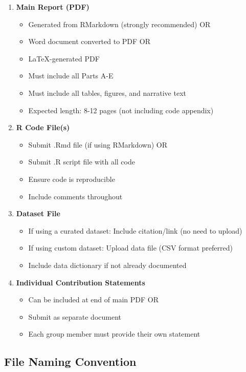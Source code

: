 \documentclass[11pt]{article}
\begin{document}
\begin{enumerate}
\item \textbf{Main Report (PDF)}
  \begin{itemize}
  \item Generated from RMarkdown (strongly recommended) OR
  \item Word document converted to PDF OR
  \item LaTeX-generated PDF
  \item Must include all Parts A-E
  \item Must include all tables, figures, and narrative text
  \item Expected length: 8-12 pages (not including code appendix)
  \end{itemize}

\item \textbf{R Code File(s)}
  \begin{itemize}
  \item Submit .Rmd file (if using RMarkdown) OR
  \item Submit .R script file with all code
  \item Ensure code is reproducible
  \item Include comments throughout
  \end{itemize}

\item \textbf{Dataset File}
  \begin{itemize}
  \item If using a curated dataset: Include citation/link (no need to upload)
  \item If using custom dataset: Upload data file (CSV format preferred)
  \item Include data dictionary if not already documented
  \end{itemize}

\item \textbf{Individual Contribution Statements}
  \begin{itemize}
  \item Can be included at end of main PDF OR
  \item Submit as separate document
  \item Each group member must provide their own statement
  \end{itemize}
\end{enumerate}

\subsection*{File Naming Convention}
\end{document}
